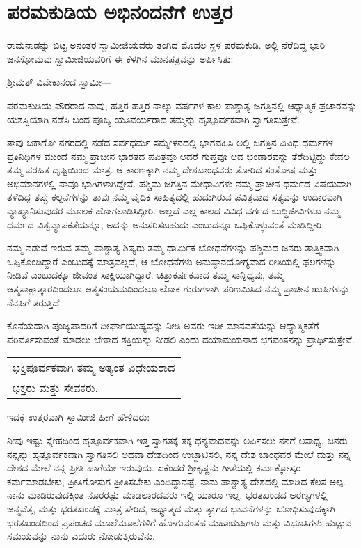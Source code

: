 
\chapter{ಪರಮಕುಡಿಯ ಅಭಿನಂದನೆಗೆ ಉತ್ತರ}

ರಾಮನಾಡನ್ನು ಬಿಟ್ಟ ಅನಂತರ ಸ್ವಾಮೀಜಿಯವರು ತಂಗಿದ ಮೊದಲ ಸ್ಥಳ ಪರಮಕುಡಿ. ಅಲ್ಲಿ ನೆರೆದಿದ್ದ ಭಾರಿ ಜನಸ್ತೋಮವು ಸ್ವಾಮೀಜಿಯವರಿಗೆ ಈ ಕೆಳಗಿನ ಮಾನಪತ್ರವನ್ನು ಅರ್ಪಿಸಿತು:

ಶ‍್ರೀಮತ್​ ವಿವೇಕಾನಂದ ಸ್ವಾಮೀ—

ಪರಮಕುಡಿಯ ಪೌರರಾದ ನಾವು, ಹತ್ತಿರ ಹತ್ತಿರ ನಾಲ್ಕು ವರ್ಷಗಳ ಕಾಲ ಪಾಶ್ಚಾತ್ಯ ಜಗತ್ತಿನಲ್ಲಿ ಆಧ್ಯಾತ್ಮಿಕ ಪ್ರಚಾರವನ್ನು ಯಶಸ್ವಿಯಾಗಿ ನಡೆಸಿ ಬಂದ ಪೂಜ್ಯ ಯತಿವರ್ಯರಾದ ತಮ್ಮನ್ನು ಹೃತ್ಪೂರ್ವಕವಾಗಿ ಸ್ವಾಗತಿಸುತ್ತೇವೆ.

ತಾವು ಚಿಕಾಗೋ ನಗರದಲ್ಲಿ ನಡೆದ ಸರ್ವಧರ್ಮ ಸಮ್ಮೇಳನದಲ್ಲಿ ಭಾಗವಹಿಸಿ ಅಲ್ಲಿ ಜಗತ್ತಿನ ವಿವಿಧ ಧರ್ಮಗಳ ಪ್ರತಿನಿಧಿಗಳ ಮುಂದೆ ನಮ್ಮ ಪ್ರಾಚೀನ ಭಾರತದ ಪವಿತ್ರವೂ ಆದರೆ ಗುಪ್ತವೂ ಆದ ಭಂಡಾರವನ್ನು ತೆರೆದಿಟ್ಟಿದ್ದು ಕೇವಲ ತಮ್ಮ ಪರಹಿತ ದೃಷ್ಟಿಯಿಂದ ಮಾತ್ರ. ಆ ಕಾರಣಕ್ಕಾಗಿ ನಮ್ಮ ದೇಶಬಾಂಧವರು ತೋರಿದ ಸಂತೋಷ ಮತ್ತು ಅಭಿಮಾನಗಳಲ್ಲಿ ನಾವೂ ಭಾಗಿಗಳಾಗಿದ್ದೇವೆ. ಪಶ್ಚಿಮ ಜಗತ್ತಿನ ಮೇಧಾವಿಗಳು ನಮ್ಮ ಪ್ರಾಚೀನ ಧರ್ಮದ ವಿಷಯವಾಗಿ ತಳೆದಿದ್ದ ತಪ್ಪು ಕಲ್ಪನೆಗಳನ್ನು ತಾವು ನಮ್ಮ ವೈದಿಕ ಸಾಹಿತ್ಯದಲ್ಲಿ ಹುದುಗಿರುವ ಪವಿತ್ರವಾದ ಸತ್ಯವನ್ನು ಉದಾರವಾಗಿ ವ್ಯಾಖ್ಯಾನಿಸುವುದರ ಮೂಲಕ ಹೋಗಲಾಡಿಸಿದ್ದೀರಿ. ಅಲ್ಲದೆ ಎಲ್ಲ ಕಾಲದ ವಿವಿಧ ವರ್ಗದ ಬುದ್ಧಿಜೀವಿಗಳೂ ನಮ್ಮ ಧರ್ಮದ ವಿಶ್ವವ್ಯಾಪಕತೆಯನ್ನೂ, ಅದನ್ನು ಅನುಸರಿಸಬಹುದು ಎಂಬುದನ್ನೂ ಒಪ್ಪಿಕೊಳ್ಳುವಂತೆ ಮಾಡಿದ್ದೀರಿ.

ನಮ್ಮ ನಡುವೆ ಇರುವ ತಮ್ಮ ಪಾಶ್ಚಾತ್ಯ ಶಿಷ್ಯರು ತಮ್ಮ ಧಾರ್ಮಿಕ ಬೋಧನೆಗಳನ್ನು ಪಶ್ಚಿಮದ ಜನರು ತಾತ್ತ್ವಿಕವಾಗಿ ಒಪ್ಪಿಕೊಂಡಿದ್ದಾರೆ ಎಂಬುದಕ್ಕೆ ಮಾತ್ರವಲ್ಲದೆ, ಆ ಬೋಧನೆಗಳು ಅನುಷ್ಠಾನಯೋಗ್ಯವಾದ ರೀತಿಯಲ್ಲಿ ಫಲಗಳನ್ನು ನೀಡಿವೆ ಎಂಬುದಕ್ಕೂ ಜೀವಂತ ಸಾಕ್ಷಿಯಾಗಿದ್ದಾರೆ. ಚಿತ್ತಾಕರ್ಷಕವಾದ ತಮ್ಮ ಸಾನ್ನಿಧ್ಯವು, ತಮ್ಮ ಆತ್ಮಸಾಕ್ಷಾತ್ಕಾರದಿಂದಲೂ ಆತ್ಮಸಂಯಮದಿಂದಲೂ ಲೋಕ ಗುರುಗಳಾಗಿ ಪರಿಣಮಿಸಿದ ನಮ್ಮ ಪ್ರಾಚೀನ ಋಷಿಗಳನ್ನು ನೆನಪಿಗೆ ತರುತ್ತಿದೆ.

ಕೊನೆಯದಾಗಿ ಪೂಜ್ಯಪಾದರಿಗೆ ದೀರ್ಘಾಯುಷ್ಯವನ್ನು ನೀಡಿ ಅವರು ಇಡೀ ಮಾನವತೆಯನ್ನು ಆಧ್ಯಾತ್ಮಿಕತೆಗೆ ಪರಿವರ್ತಿಸುವಂತೆ ಮಾಡಲು ಬೇಕಾದ ಶಕ್ತಿಯನ್ನು ನೀಡಲಿ ಎಂದು ದಯಾಮಯನಾದ ಭಗವಂತನನ್ನು ಪ್ರಾರ್ಥಿಸುತ್ತೇವೆ.

\begin{longtable}[r]{@{}l@{}}
ಭಕ್ತಿಪೂರ್ವಕವಾಗಿ ತಮ್ಮ ಅತ್ಯಂತ ವಿಧೇಯರಾದ \\
ಭಕ್ತರು ಮತ್ತು ಸೇವಕರು. \\
\end{longtable}

ಇದಕ್ಕೆ ಉತ್ತರವಾಗಿ ಸ್ವಾಮೀಜಿ ಹೀಗೆ ಹೇಳಿದರು:

ನೀವು ಇಷ್ಟು ಸ್ನೇಹದಿಂದ ಹೃತ್ಪೂರ್ವಕವಾಗಿ ಇತ್ತ ಸ್ವಾಗತಕ್ಕೆ ತಕ್ಕ ಧನ್ಯವಾದವನ್ನು ಅರ್ಪಿಸಲು ನನಗೆ ಅಸಾಧ್ಯ. ಜನರು ನನ್ನನ್ನು ಹೃತ್ಪೂರ್ವಕವಾಗಿ ಸ್ವಾಗತಿಸಲಿ ಅಥವಾ ದೇಶದಿಂದ ಉಚ್ಛಾಟಿಸಲಿ, ನನ್ನ ದೇಶ ಬಾಂಧವರ ಮೇಲೆ ಮತ್ತು ನನ್ನ ದೇಶದ ಮೇಲೆ ನನ್ನ ಪ್ರೀತಿ ಹಾಗೆಯೇ ಇರುವುದು. ಏಕೆಂದರೆ ಶ‍್ರೀಕೃಷ್ಣನು ಗೀತೆಯಲ್ಲಿ ಕರ್ಮಕ್ಕೋಸ್ಕರ ಕರ್ಮಮಾಡಬೇಕು, ಪ್ರೀತಿಗೋಸುಗ ಪ್ರೀತಿಸಬೇಕು ಎಂದಿದ್ದಾನಷ್ಟೆ. ನಾನು ಪಾಶ್ಚಾತ್ಯ ದೇಶದಲ್ಲಿ ಮಾಡಿದ ಕೆಲಸ ಅಲ್ಪ. ನಾನು ಮಾಡಿರುವುದಕ್ಕಿಂತ ನೂರರಷ್ಟು ಮಾಡಲಾರದವರು ಇಲ್ಲಿ ಯಾರೂ ಇಲ್ಲ. ಭರತಖಂಡದ ಅರಣ್ಯಗಳಲ್ಲಿ ಜನ್ಮವೆತ್ತ, ಮತ್ತು ಭರತಖಂಡಕ್ಕೆ ಮಾತ್ರ ಸೇರಿದ, ಅಧ್ಯಾತ್ಮದ ಮತ್ತು ತ್ಯಾಗದ ಭಾವನೆಗಳನ್ನು ಬೋಧಿಸುವುದಕ್ಕಾಗಿ ಭರತಖಂಡದಿಂದ ಪ್ರಪಂಚದ ಮೂಲೆಮೂಲೆಗಳಿಗೆ ಹೋಗುವಂತಹ ಮಹಾಋಷಿಗಳು ಮತ್ತು ವಿಭೂತಿಗಳು ಹುಟ್ಟುವ ಸಮಯವನ್ನು ನಾನು ಎದುರು ನೋಡುತ್ತಿರುವೆನು.

